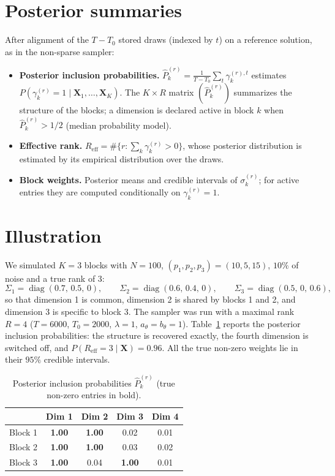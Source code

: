 \documentclass[11pt]{article}
\DeclareMathOperator{\diag}{diag}
\newcommand{\X}{\mathbf{X}}
\begin{document}
\section{Posterior summaries}

After alignment of the $T-T_0$ stored draws (indexed by $t$) on a reference solution, as in the non-sparse sampler:
\begin{itemize}
  \item \textbf{Posterior inclusion probabilities.}
        $\hat P_k^{(r)}=\frac{1}{T-T_0}\sum_t\gamma_k^{(r),t}$ estimates $P(\gamma_k^{(r)}=1\mid\X_1,\ldots,\X_K)$. The
        $K\times R$ matrix $(\hat P_k^{(r)})$ summarizes the structure of the blocks; a dimension is declared active in
        block $k$ when $\hat P_k^{(r)}>1/2$ (median probability model).
  \item \textbf{Effective rank.} $R_{\mathrm{eff}}=\#\{r:\sum_k\gamma_k^{(r)}>0\}$, whose posterior distribution is
        estimated by its empirical distribution over the draws.
  \item \textbf{Block weights.} Posterior means and credible intervals of $\sigma_k^{(r)}$; for active entries they are
        computed conditionally on $\gamma_k^{(r)}=1$.
\end{itemize}

\section{Illustration}

We simulated $K=3$ blocks with $N=100$, $(p_1,p_2,p_3)=(10,5,15)$, $10\%$ of noise and a true rank of $3$:
\[
  \Sigma_1=\diag(0.7,\,0.5,\,0),\qquad \Sigma_2=\diag(0.6,\,0.4,\,0),\qquad \Sigma_3=\diag(0.5,\,0,\,0.6),
\]
so that dimension 1 is common, dimension 2 is shared by blocks 1 and 2, and dimension 3 is specific to block 3.
The sampler was run with a maximal rank $R=4$ ($T=6000$, $T_0=2000$, $\lambda=1$, $a_\theta=b_\theta=1$).
Table~\ref{tab:pip} reports the posterior inclusion probabilities: the structure is recovered exactly, the fourth
dimension is switched off, and $P(R_{\mathrm{eff}}=3\mid\X)=0.96$. All the true non-zero weights lie in their $95\%$
credible intervals.

\begin{table}[ht]
\centering
\caption{Posterior inclusion probabilities $\hat P_k^{(r)}$ (true non-zero entries in bold).}\label{tab:pip}
\begin{tabular}{lcccc}
\toprule
        & Dim 1 & Dim 2 & Dim 3 & Dim 4 \\
\midrule
Block 1 & \textbf{1.00} & \textbf{1.00} & 0.02 & 0.01 \\
Block 2 & \textbf{1.00} & \textbf{1.00} & 0.03 & 0.02 \\
Block 3 & \textbf{1.00} & 0.04 & \textbf{1.00} & 0.01 \\
\bottomrule
\end{tabular}
\end{table}
\end{document}
